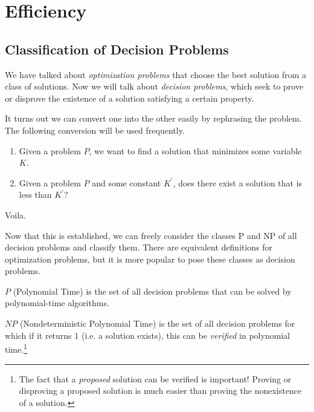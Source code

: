 \section{Efficiency} 
  
\subsection{Classification of Decision Problems}

  We have talked about \textit{optimization problems} that choose the best solution from a class of solutions. Now we will talk about \textit{decision problems}, which seek to prove or disprove the existence of a solution satisfying a certain property. 

  \begin{lemma}
    \label{thm:conversion-between-optimization-and-decision}
    It turns out we can convert one into the other easily by rephrasing the problem. The following conversion will be used frequently.  
    \begin{enumerate}
      \item Given a problem $P$, we want to find a solution that minimizes some variable $K$. 
      \item Given a problem $P$ and some constant $K^\prime$, does there exist a solution that is less than $K^\prime$? 
    \end{enumerate}
    Voila.  
  \end{lemma}

  Now that this is established, we can freely consider the classes P and NP of all decision problems and classify them. There are equivalent definitions for optimization problems, but it is more popular to pose these classes as decision problems. 

  \begin{definition}[P]
    \label{def:p}
    $P$ (Polynomial Time) is the set of all decision problems that can be solved by polynomial-time algorithms. 
  \end{definition} 

  \begin{definition}[NP]
    \label{def:np}
    $NP$ (Nondeterministic Polynomial Time) is the set of all decision problems for which if it returns $1$ (i.e. a solution exists), this can be \textit{verified} in polynomial time.\footnote{The fact that a \textit{proposed} solution can be verified is important! Proving or disproving a proposed solution is much easier than proving the nonexistence of a solution.}
  \end{definition}


